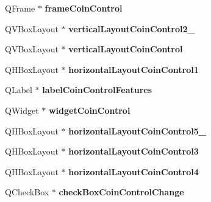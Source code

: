\begin{DoxyCompactItemize}
\item 
\mbox{\label{class_ui___privacy_dialog_a849cd8ff56672b2df5624a622a34abe8}} 
Q\+Frame $\ast$ {\bfseries frame\+Coin\+Control}
\item 
\mbox{\label{class_ui___privacy_dialog_a4fc149e518166009fd9decc3bd952850}} 
Q\+V\+Box\+Layout $\ast$ {\bfseries vertical\+Layout\+Coin\+Control2\+\_}
\item 
\mbox{\label{class_ui___privacy_dialog_ad86166b5f63bfeb073ceff0b0c35d935}} 
Q\+V\+Box\+Layout $\ast$ {\bfseries vertical\+Layout\+Coin\+Control}
\item 
\mbox{\label{class_ui___privacy_dialog_a791547e37ec02adf5009c7d2a6ce1824}} 
Q\+H\+Box\+Layout $\ast$ {\bfseries horizontal\+Layout\+Coin\+Control1}
\item 
\mbox{\label{class_ui___privacy_dialog_a3a98872a54f7aa1cdac85864899aeee4}} 
Q\+Label $\ast$ {\bfseries label\+Coin\+Control\+Features}
\item 
\mbox{\label{class_ui___privacy_dialog_ad19c7997982eb43a1358d954c3b9f8dd}} 
Q\+Widget $\ast$ {\bfseries widget\+Coin\+Control}
\item 
\mbox{\label{class_ui___privacy_dialog_aa66e79d65e1fad02eab18fa7cd8eb7c6}} 
Q\+H\+Box\+Layout $\ast$ {\bfseries horizontal\+Layout\+Coin\+Control5\+\_}
\item 
\mbox{\label{class_ui___privacy_dialog_a59e788d67f4df2eed27702556ebb7442}} 
Q\+H\+Box\+Layout $\ast$ {\bfseries horizontal\+Layout\+Coin\+Control3}
\item 
\mbox{\label{class_ui___privacy_dialog_a01e73b8d0113a02fa57a64942e0a7bdd}} 
Q\+H\+Box\+Layout $\ast$ {\bfseries horizontal\+Layout\+Coin\+Control4}
\item 
\mbox{\label{class_ui___privacy_dialog_aa6ba84f5ce099ce10c8a6d5ffe47fade}} 
Q\+Check\+Box $\ast$ {\bfseries check\+Box\+Coin\+Control\+Change}

\end{DoxyCompactItemize}
